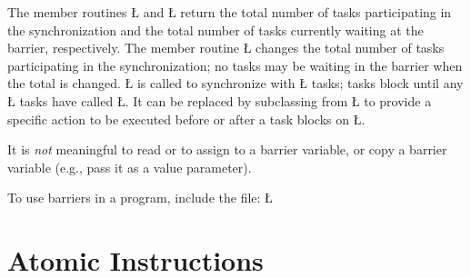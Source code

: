 \documentclass[openright,twoside]{report}
\begin{document}
The member routines \LGinlinetrue\LGbegin\lgrinde\L{}\endlgrinde\LGend{} and \LGinlinetrue\LGbegin\lgrinde\L{}\endlgrinde\LGend{} return the total number of tasks participating in the synchronization and the total number of tasks currently waiting at the barrier, respectively.
The member routine \LGinlinetrue\LGbegin\lgrinde\L{}\endlgrinde\LGend{} changes the total number of tasks participating in the synchronization;
no tasks may be waiting in the barrier when the total is changed.
\LGinlinetrue\LGbegin\lgrinde\L{}\endlgrinde\LGend{} is called to synchronize with \LGinlinetrue\LGbegin\lgrinde\L{}\endlgrinde\LGend{} tasks;
tasks block until any \LGinlinetrue\LGbegin\lgrinde\L{}\endlgrinde\LGend{} tasks have called \LGinlinetrue\LGbegin\lgrinde\L{}\endlgrinde\LGend{}.
It can be replaced by subclassing from \LGinlinetrue\LGbegin\lgrinde\L{}\endlgrinde\LGend{} to provide a specific action to be executed before or after a task blocks on \LGinlinetrue\LGbegin\lgrinde\L{}\endlgrinde\LGend{}.

It is \emph{not} meaningful to read or to assign to a barrier variable, or copy a barrier variable (e.g., pass it as a value parameter).

To use barriers in a \uC program, include the file:
\LGinlinefalse\LGbegin\lgrinde
\L{}
\endlgrinde\LGend
{}%


\section{Atomic Instructions}
\end{document}
